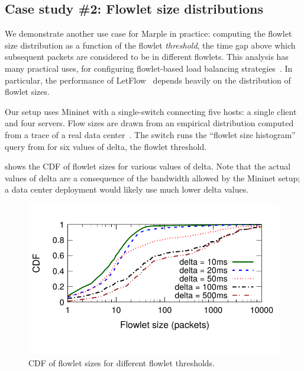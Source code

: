 \subsection{Case study \#2: Flowlet size distributions}
\label{s:eval:mininet-flowlet}
\label{sec:eval:mininet-flowlet}

We demonstrate another use case for Marple in practice: computing the flowlet
size distribution as a function of the flowlet
\emph{threshold}, the time gap above which subsequent packets are considered to
be in different flowlets.
This analysis has many
practical uses, \eg for configuring flowlet-based load balancing
strategies~\cite{conga, letflow}.
In particular, the performance of LetFlow~\cite{letflow} depends heavily
on the distribution of flowlet sizes. 

Our setup uses Mininet with a single-switch connecting five hosts: a single
client and four servers. Flow sizes are drawn from an empirical distribution
computed from a trace of a real data center~\cite{empirical-flow-data}.  The
switch runs the ``flowlet size histogram'' query from
 for six values of {\ct delta}, the flowlet
threshold.

 shows the CDF of flowlet sizes for various values of {\ct
delta}. Note that the actual values of {\ct delta} are a consequence of the
bandwidth allowed by the Mininet setup; a data center deployment would likely
use much lower {\ct delta} values.

\begin{figure}[!t]
\centering
\vspace{-0.2in}
\includegraphics[width=0.8\columnwidth]{pq_flowlet-cdf.pdf}
\vspace{-0.3in}
\caption{CDF of flowlet sizes for different flowlet thresholds.}
\vspace{-0.15in}
\label{fig:flowletcdf}
\end{figure}
